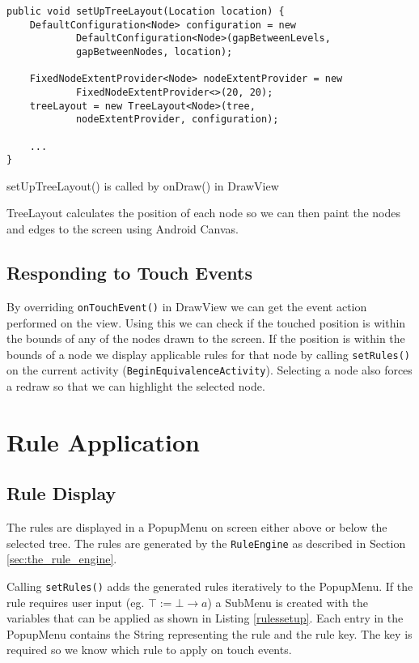 \documentclass{report}
\begin{document}
\begin{listing}[ht]
\begin{verbatim}
public void setUpTreeLayout(Location location) {
    DefaultConfiguration<Node> configuration = new 
            DefaultConfiguration<Node>(gapBetweenLevels, 
            gapBetweenNodes, location);

    FixedNodeExtentProvider<Node> nodeExtentProvider = new 
            FixedNodeExtentProvider<>(20, 20);
    treeLayout = new TreeLayout<Node>(tree,
            nodeExtentProvider, configuration);

    ...
}
\end{verbatim}
\caption{setUpTreeLayout() is called by onDraw() in DrawView}
\label{setuptreelayout}
\end{listing}

TreeLayout calculates the position of each node so we can then paint the nodes and edges to the screen using Android Canvas.

\subsection{Responding to Touch Events}

By overriding {\tt onTouchEvent()} in DrawView we can get the event action performed on the view. Using this we can check if the touched position is within the bounds of any of the nodes drawn to the screen. If the position is within the bounds of a node we display applicable rules for that node by calling {\tt setRules()} on the current activity ({\tt BeginEquivalenceActivity}). Selecting a node also forces a redraw so that we can highlight the selected node.

\section{Rule Application}

\subsection{Rule Display}

The rules are displayed in a PopupMenu on screen either above or below the selected tree. The rules are generated by the {\tt RuleEngine} as described in Section \ref{sec:the_rule_engine}.

Calling {\tt setRules()} adds the generated rules iteratively to the PopupMenu. If the rule requires user input (eg. $\top := \bot \to a$) a SubMenu is created with the variables that can be applied as shown in Listing \ref{rulessetup}. Each entry in the PopupMenu contains the String representing the rule and the rule key. The key is required so we know which rule to apply on touch events.
\end{document}
